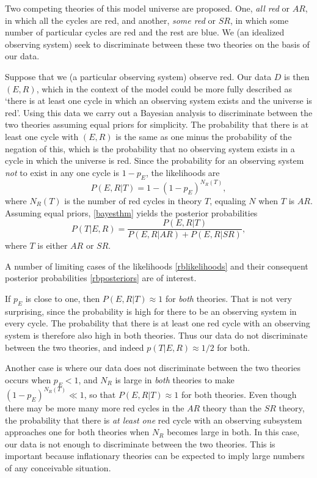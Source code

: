 \documentclass[pra,twocolumn,nofootinbib,eqsecnum,floatfix]{revtex4}
\begin{document}
Two competing theories of this model universe are proposed. One, {\it all red\/} or $AR$, 
in which all the cycles are red, and another, {\it some red\/} or $SR$, in which some number of particular cycles are red and the rest are blue. We (an idealized observing system) seek to discriminate between these two theories on the basis of our data. 

Suppose that we (a particular observing system) observe red. Our data $D$ is then $(E,R)$, 
which in the context of the model could be more fully described as `there is at least one cycle in which an observing system exists and the universe is red'.   Using this data we carry out a Bayesian analysis to discriminate between the two theories assuming equal priors for simplicity. The probability that there is at least one cycle with $(E,R)$ is the same as one minus the 
probability of the negation of this, which is 
the probability that no observing system exists in a cycle in which the universe is red. Since the probability for an observing system {\it not\/} to exist in any one cycle is $1-p_E$, the likelihoods are
\begin{equation}
P(E,R|T) = 1 - (1-p_{E})^{N_R(T)}  ,
\label{rblikelihoods}
\end{equation}
where $N_R(T)$ is the number of red cycles in theory $T$, equaling $N$ when $T$ is  $AR$. Assuming equal priors, \eqref{bayesthm} yields the posterior probabilities 
\begin{equation}
P(T|E,R) = \frac{P(E,R|T)}{P(E,R|AR) + P(E,R|SR)},
\label{rbposteriors}
\end{equation}
where $T$ is either $AR$ or $SR$. 

A number of limiting cases of the likelihoods \eqref{rblikelihoods} and their consequent posterior probabilities \eqref{rbposteriors} are of interest.   

If $p_E$ is close to one, then 
$P(E,R|T) \approx 1$ for {\it both\/} theories. That is not very surprising, since the probability is high for there to be an observing system in every cycle. The probability that there is at least one red cycle with an observing system is therefore also high in both theories. Thus our data do not discriminate between the two theories, and indeed  $p(T|E,R) \approx 1/2$ for both. 

Another case is where our data does not discriminate between the two theories occurs when 
$p_E <1$, and $N_R$ is large in {\it both} theories to make $(1-p_E)^{N_R(T)}\ll 1$, so that
$P(E,R|T)\approx 1$ for both theories. 
Even though there may be  more many more red cycles in the $AR$ theory than the $SR$ theory, the probability that there is {\it at least one} red cycle with an observing subsystem approaches one for both theories when $N_R$ becomes large in both. In this case, our data is not enough to discriminate between the two theories. 
This is important because inflationary theories can be expected to imply large numbers of any conceivable situation. 
\end{document}
